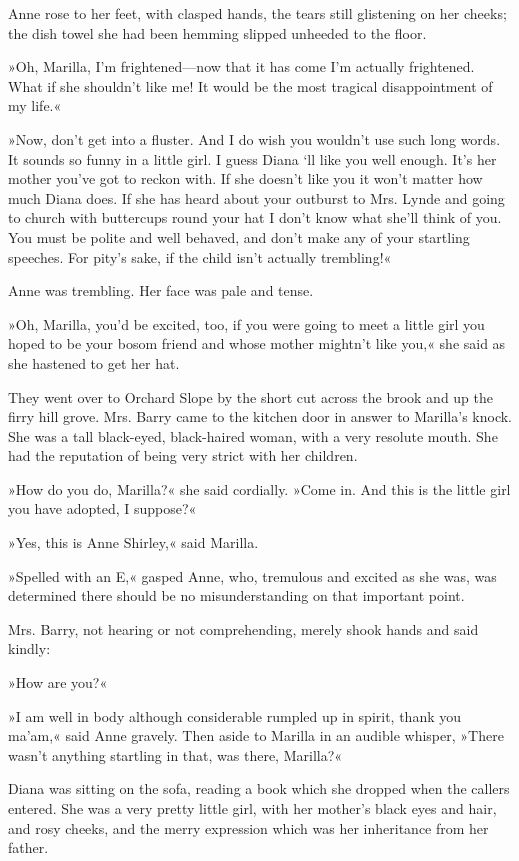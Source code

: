 Anne rose to her feet, with clasped hands, the tears still glistening on her cheeks; the dish towel she had been hemming slipped unheeded to the floor.

»Oh, Marilla, I’m frightened—now that it has come I’m actually frightened. What if she shouldn’t like me! It would be the most tragical disappointment of my life.«

»Now, don’t get into a fluster. And I do wish you wouldn’t use such long words. It sounds so funny in a little girl. I guess Diana `ll like you well enough. It's her mother you’ve got to reckon with. If she doesn’t like you it won’t matter how much Diana does. If she has heard about your outburst to Mrs. Lynde and going to church with buttercups round your hat I don’t know what she’ll think of you. You must be polite and well behaved, and don’t make any of your startling speeches. For pity’s sake, if the child isn’t actually trembling!«

Anne was trembling. Her face was pale and tense.

»Oh, Marilla, you’d be excited, too, if you were going to meet a little girl you hoped to be your bosom friend and whose mother mightn’t like you,« she said as she hastened to get her hat.

They went over to Orchard Slope by the short cut across the brook and up the firry hill grove. Mrs. Barry came to the kitchen door in answer to Marilla’s knock. She was a tall black-eyed, black-haired woman, with a very resolute mouth. She had the reputation of being very strict with her children.

»How do you do, Marilla?« she said cordially. »Come in. And this is the little girl you have adopted, I suppose?«

»Yes, this is Anne Shirley,« said Marilla.

»Spelled with an E,« gasped Anne, who, tremulous and excited as she was, was determined there should be no misunderstanding on that important point.

Mrs. Barry, not hearing or not comprehending, merely shook hands and said kindly:

»How are you?«

»I am well in body although considerable rumpled up in spirit, thank you ma’am,« said Anne gravely. Then aside to Marilla in an audible whisper, »There wasn’t anything startling in that, was there, Marilla?«

Diana was sitting on the sofa, reading a book which she dropped when the callers entered. She was a very pretty little girl, with her mother’s black eyes and hair, and rosy cheeks, and the merry expression which was her inheritance from her father.

